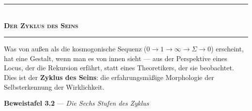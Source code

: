 \documentclass[10pt, openany, oneside]{book}
\renewcommand{\normalsize}{\fontsize{10}{13}\selectfont}
\begin{document}
\vspace{1.5em}


\begin{center}
    \rule{0.3\textwidth}{0.4pt}\\[0.5em]
    {\normalsize\bfseries\scshape Der Zyklus des Seins}\\[0.3em]
    \rule{0.3\textwidth}{0.4pt}
\end{center}

\vspace{1em}

\noindent Was von außen als die kosmogonische Sequenz ($0 \to 1 \to \infty \to \Sigma \to 0$) erscheint, hat eine Gestalt, wenn man es von innen sieht --- aus der Perspektive eines Locus, der die Rekursion erfährt, statt eines Theoretikers, der sie beobachtet. Dies ist der \textbf{Zyklus des Seins}: die erfahrungsmäßige Morphologie der Selbsterkennung der Wirklichkeit.

\vspace{0.5em}

\textbf{Beweistafel 3.2} --- \textit{Die Sechs Stufen des Zyklus}

\vspace{0.5em}
\end{document}
